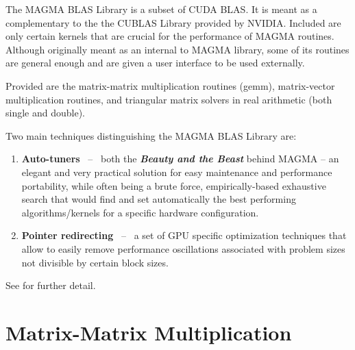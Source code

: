 \documentclass[10pt]{book}
\begin{document}
\vspace{0.1in}
The MAGMA BLAS Library is a subset of CUDA BLAS. It is meant as a 
complementary to the the CUBLAS Library provided by NVIDIA. 
Included are only certain kernels that are crucial for the performance 
of MAGMA routines. Although originally meant as an internal to MAGMA 
library, some of its routines are general enough and are given a user
interface to be used externally.

\vspace{0.1in}
Provided are the matrix-matrix multiplication routines (gemm), 
matrix-vector multiplication routines, and triangular matrix solvers
in real arithmetic (both single and double).

\vspace{0.1in}
Two main techniques distinguishing the MAGMA BLAS Library are:
\begin{enumerate}
  \item {\bf Auto-tuners} ~--~ both the {\bf {\it Beauty and the Beast}} 
  behind  MAGMA -- an elegant and very practical solution for easy maintenance 
  and performance portability, while often being a brute force, empirically-based
  exhaustive search that would find and set automatically the best performing 
  algorithms/kernels for a specific hardware configuration.
  \item {\bf Pointer redirecting} ~--~ a set of GPU specific optimization
  techniques that allow to easily remove performance oscillations associated
  with problem sizes not divisible by certain block sizes.
\end{enumerate}

\vspace{0.1in}
See \cite{lawn212,Rajib-SC09-poster} for further detail.

\newpage
\section{Matrix-Matrix Multiplication}



\footnotesize
\newpage
\end{document}
